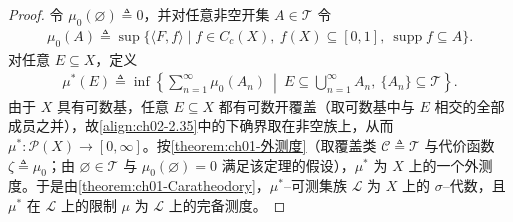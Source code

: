 \documentclass[../../main.tex]{subfiles}%
\begin{document}
\begin{proof}
令 $\mu_0(\varnothing)\triangleq0$，并对任意非空开集 $A\in\mathscr T$ 令
\begin{align}
\mu_0(A)\triangleq\sup\{\langle F,f\rangle\mid f\in C_c(X),\ f(X)\subseteq[0,1],\ \operatorname{supp}f\subseteq A\}. \label{align:ch02-2.34}
\end{align}
对任意 $E\subseteq X$，定义
\begin{align}
\mu^*(E)\triangleq\inf\left\{\sum_{n=1}^\infty\mu_0(A_n)\ \middle|\ E\subseteq\bigcup_{n=1}^\infty A_n,\ \{A_n\}\subseteq\mathscr T\right\}. \label{align:ch02-2.35}
\end{align}
由于 $X$ 具有可数基，任意 $E\subseteq X$ 都有可数开覆盖（取可数基中与 $E$ 相交的全部成员之并），故\eqref{align:ch02-2.35}中的下确界取在非空族上，从而 $\mu^*:\mathcal P(X)\to[0,\infty]$。按\cref{theorem:ch01-外测度}（取覆盖类 $\mathcal C\triangleq\mathscr T$ 与代价函数 $\zeta\triangleq\mu_0$；由 $\varnothing\in\mathscr T$ 与 $\mu_0(\varnothing)=0$ 满足该定理的假设），$\mu^*$ 为 $X$ 上的一个外测度。于是由\cref{theorem:ch01-Caratheodory}，$\mu^*$--可测集族 $\mathscr L$ 为 $X$ 上的 $\sigma$--代数，且 $\mu^*$ 在 $\mathscr L$ 上的限制 $\mu$ 为 $\mathscr L$ 上的完备测度。


\end{proof}
\end{document}
